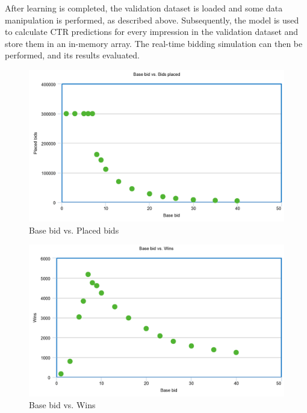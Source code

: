 \documentclass{sig-alternate-05-2015}
\begin{document}
After learning is completed, the validation dataset is loaded and some data manipulation is performed, as described above. Subsequently, the model is used to calculate CTR predictions for every impression in the validation dataset and store them in an in-memory array. The real-time bidding simulation can then be performed, and its results evaluated.

\begin{figure}
  \includegraphics[width=\linewidth]{linear_bids.png}
  \caption{Base bid vs. Placed bids}
  \label{fig:bids}
\end{figure}

\begin{figure}
  \includegraphics[width=\linewidth]{linear_wins.png}
  \caption{Base bid vs. Wins}
  \label{fig:bids}
\end{figure}
\end{document}
